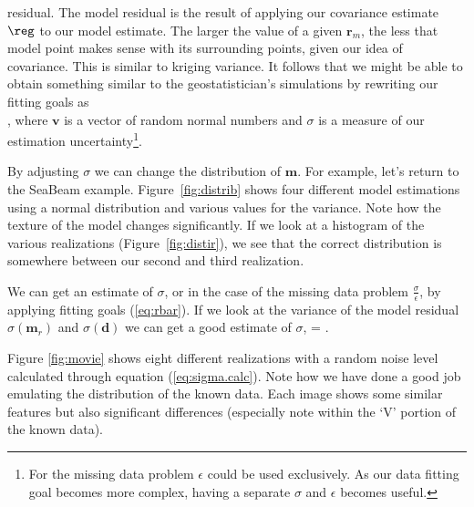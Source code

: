 residual.  The model residual is the result of applying our
covariance estimate $\reg$ to our model estimate.  The larger
the value of a given $\mathbf{r}_m$, the less that model point makes
sense with its surrounding points, given our idea of covariance.
This is similar to kriging variance.
It follows that we might be able to obtain something similar
to the geostatistician's simulations by rewriting our fitting
goals as 
\beqa
{} \pox  {}    \nonumber \\ 
\sigma {} \pox \epsilon \reg {}\label{eq:rand},
\eeqa
where $\mathbf{v}$ is a vector of random normal numbers and $\sigma$ is 
a measure of our estimation uncertainty\footnote{For the missing
data problem $\epsilon$ could be used exclusively.
As  our data fitting goal becomes more complex,
having a separate  $\sigma$ and $\epsilon$ becomes useful.}.

By adjusting $\sigma$
we can change the distribution of
$\mathbf{m}$. For example, let's return to the SeaBeam example.
Figure~\ref{fig:distrib} shows four different model estimations
using a normal distribution and various values for the variance.
Note how the texture of the model changes significantly. If we look
at a histogram of the various realizations (Figure~\ref{fig:distir}),
we see that the correct
distribution is somewhere between our second and third realization.
\par 
We can get an estimate of $\sigma$, or in the case of the missing
data problem $\frac{\sigma}{\epsilon}$, by applying fitting goals 
(\ref{eq:rbar}). If we look at the variance of the model residual $\sigma(\mathbf{m}_r)$  and 
$\sigma(\mathbf{d})$ we can get a good estimate of $\sigma$,
\beq
\sigma =  \label{eq:sigma.calc} .
\eeq

%


\par 
Figure \ref{fig:movie} shows eight different realizations with a
random noise level calculated through equation (\ref{eq:sigma.calc}).
Note how we have done a good job emulating the
distribution of the known data. Each image shows some similar
features but also significant differences (especially note
within the `V' portion of the known data).
\par


